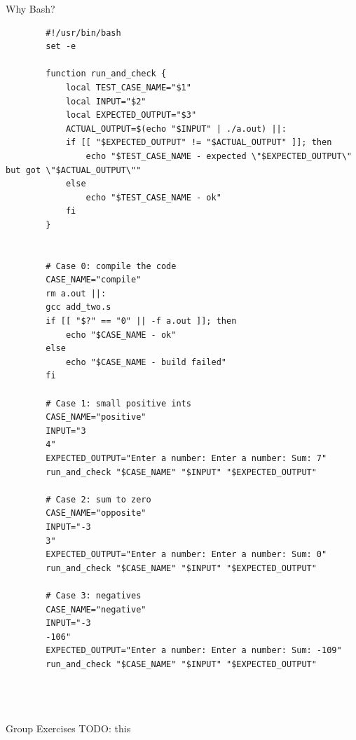 \begin{frame}[fragile]{Why Bash?}
	\begin{verbatim}
		#!/usr/bin/bash
		set -e

		function run_and_check {
			local TEST_CASE_NAME="$1"
			local INPUT="$2"
			local EXPECTED_OUTPUT="$3"
			ACTUAL_OUTPUT=$(echo "$INPUT" | ./a.out) ||:
			if [[ "$EXPECTED_OUTPUT" != "$ACTUAL_OUTPUT" ]]; then
				echo "$TEST_CASE_NAME - expected \"$EXPECTED_OUTPUT\" but got \"$ACTUAL_OUTPUT\""
			else
				echo "$TEST_CASE_NAME - ok"
			fi
		}
		
		
		# Case 0: compile the code
		CASE_NAME="compile"
		rm a.out ||:
		gcc add_two.s 
		if [[ "$?" == "0" || -f a.out ]]; then 
			echo "$CASE_NAME - ok"
		else
			echo "$CASE_NAME - build failed"
		fi
		
		# Case 1: small positive ints
		CASE_NAME="positive"
		INPUT="3
		4"
		EXPECTED_OUTPUT="Enter a number: Enter a number: Sum: 7"
		run_and_check "$CASE_NAME" "$INPUT" "$EXPECTED_OUTPUT"
		
		# Case 2: sum to zero
		CASE_NAME="opposite"
		INPUT="-3
		3"
		EXPECTED_OUTPUT="Enter a number: Enter a number: Sum: 0"
		run_and_check "$CASE_NAME" "$INPUT" "$EXPECTED_OUTPUT"
		
		# Case 3: negatives
		CASE_NAME="negative"
		INPUT="-3
		-106"
		EXPECTED_OUTPUT="Enter a number: Enter a number: Sum: -109"
		run_and_check "$CASE_NAME" "$INPUT" "$EXPECTED_OUTPUT"
		
		
		
	\end{verbatim}
\end{frame}

\begin{frame}{Group Exercises}
TODO: this
\end{frame}









